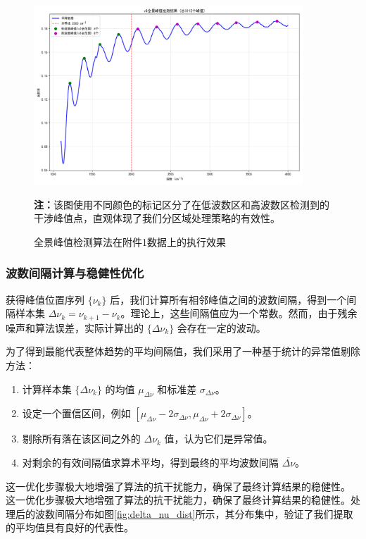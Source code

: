 \documentclass[withoutpreface,bwprint]{cumcmthesis} %
\begin{document}
\begin{figure}[htbp]
    \centering
    \includegraphics[width=0.9\textwidth]{figures/peak_detection_10deg.png}
    \caption{全景峰值检测算法在附件1数据上的执行效果}
    \label{fig:peak_detection}
    \textbf{注：}该图使用不同颜色的标记区分了在低波数区和高波数区检测到的干涉峰值点，直观体现了我们分区域处理策略的有效性。
\end{figure}

\subsubsection{波数间隔计算与稳健性优化}
获得峰值位置序列 $\{\nu_k\}$ 后，我们计算所有相邻峰值之间的波数间隔，得到一个间隔样本集 $\Delta\nu_k = \nu_{k+1} - \nu_k$。理论上，这些间隔值应为一个常数。然而，由于残余噪声和算法误差，实际计算出的 $\{\Delta\nu_k\}$ 会存在一定的波动。

为了得到最能代表整体趋势的平均间隔值，我们采用了一种基于统计的异常值剔除方法：
\begin{enumerate}
    \item 计算样本集 $\{\Delta\nu_k\}$ 的均值 $\mu_{\Delta\nu}$ 和标准差 $\sigma_{\Delta\nu}$。
    \item 设定一个置信区间，例如 $[\mu_{\Delta\nu} - 2\sigma_{\Delta\nu}, \mu_{\Delta\nu} + 2\sigma_{\Delta\nu}]$。
    \item 剔除所有落在该区间之外的 $\Delta\nu_k$ 值，认为它们是异常值。
    \item 对剩余的有效间隔值求算术平均，得到最终的平均波数间隔 $\overline{\Delta\nu}$。
\end{enumerate}
这一优化步骤极大地增强了算法的抗干扰能力，确保了最终计算结果的稳健性。
这一优化步骤极大地增强了算法的抗干扰能力，确保了最终计算结果的稳健性。处理后的波数间隔分布如图\ref{fig:delta_nu_dist}所示，其分布集中，验证了我们提取的平均值具有良好的代表性。
\end{document}
